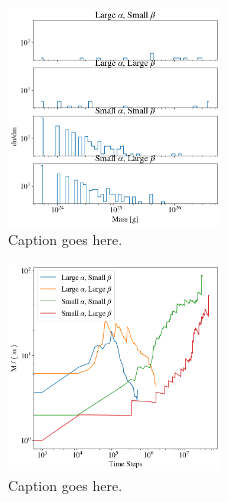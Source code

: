 \documentclass[twocolumn]{aastex63}
\begin{document}
\begin{figure}
\begin{center}
    \includegraphics[width=0.5\textwidth]{figures/alpha_beta_mass.png}
    \caption{Caption goes here.\label{fig:alpha_beta_mass}}
\end{center}
\end{figure}

\begin{figure}
\begin{center}
    \includegraphics[width=0.5\textwidth]{figures/alpha_beta_evo.png}
    \caption{Caption goes here.\label{fig:alpha_beta_evo}}
\end{center}
\end{figure}

\end{document}
